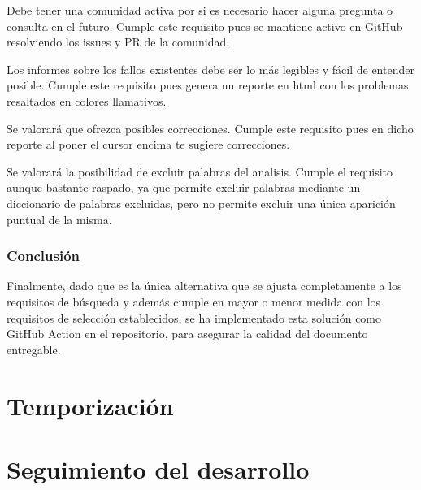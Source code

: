 \begin{todolist}
    \item[\done] Debe tener una comunidad activa por si es necesario hacer
    alguna pregunta o consulta en el futuro. Cumple este requisito pues se
    mantiene activo en GitHub resolviendo los issues y PR de la comunidad.
    \item[\done] Los informes sobre los fallos existentes debe ser lo más
    legibles y fácil de entender posible. Cumple este requisito pues genera un
    reporte en html con los problemas resaltados en colores llamativos.
    \item[\done] Se valorará que ofrezca posibles correcciones. Cumple este
    requisito pues en dicho reporte al poner el cursor encima te sugiere
    correcciones.
    \item [\done] Se valorará la posibilidad de excluir palabras del analisis.
    Cumple el requisito aunque bastante raspado, ya que permite excluir palabras
    mediante un diccionario de palabras excluidas, pero no permite excluir una
    única aparición puntual de la misma.
\end{todolist}

\subsubsection{Conclusión}
Finalmente, dado que es la única alternativa que se ajusta completamente a los
requisitos de búsqueda y además cumple en mayor o menor medida con los
requisitos de selección establecidos, se ha implementado esta solución como
GitHub Action en el repositorio, para asegurar la calidad del documento
entregable.

\section{Temporización}

\section{Seguimiento del desarrollo}
